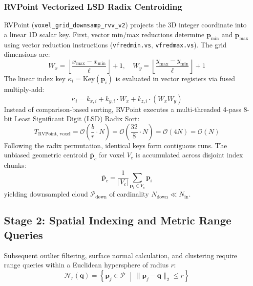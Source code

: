 \documentclass[journal,compsoc]{IEEEtran}
\begin{document}
\subsubsection{RVPoint Vectorized LSD Radix Centroiding}
RVPoint (\texttt{voxel\_grid\_downsamp\_rvv\_v2}) projects the 3D integer coordinate into a linear 1D scalar key. First, vector min/max reductions determine $\bm{p}_{\min}$ and $\bm{p}_{\max}$ using vector reduction instructions (\texttt{vfredmin.vs}, \texttt{vfredmax.vs}). The grid dimensions are:
\begin{equation}
W_x = \left\lfloor \frac{x_{\max} - x_{\min}}{\ell} \right\rfloor + 1, \quad W_y = \left\lfloor \frac{y_{\max} - y_{\min}}{\ell} \right\rfloor + 1
\end{equation}
The linear index key $\kappa_i = \text{Key}(\bm{p}_i)$ is evaluated in vector registers via fused multiply-add:
\begin{equation}
\kappa_i = k_{x,i} + k_{y,i} \cdot W_x + k_{z,i} \cdot (W_x W_y)
\label{eq:voxel_key}
\end{equation}
Instead of comparison-based sorting, RVPoint executes a multi-threaded 4-pass 8-bit Least Significant Digit (LSD) Radix Sort:
\begin{equation}
T_{\text{RVPoint, voxel}} = \mathcal{O}\left( \frac{b}{r} \cdot N \right) = \mathcal{O}\left( \frac{32}{8} \cdot N \right) = \mathcal{O}(4N) = \mathcal{O}(N)
\end{equation}
Following the radix permutation, identical keys form contiguous runs. The unbiased geometric centroid $\bar{\bm{p}}_c$ for voxel $V_c$ is accumulated across disjoint index chunks:
\begin{equation}
\bar{\bm{p}}_c = \frac{1}{|V_c|} \sum_{\bm{p}_i \in V_c} \bm{p}_i
\label{eq:centroid}
\end{equation}
yielding downsampled cloud $\mathcal{P}_{\text{down}}$ of cardinality $N_{\text{down}} \ll N_{\text{in}}$.

\subsection{Stage 2: Spatial Indexing and Metric Range Queries}
\label{sec:spatial_indexing}

Subsequent outlier filtering, surface normal calculation, and clustering require range queries within a Euclidean hypersphere of radius $r$:
\begin{equation}
\mathcal{N}_r(\bm{q}) = \left\{ \bm{p}_j \in \mathcal{P} \;\middle|\; \|\bm{p}_j - \bm{q}\|_2 \le r \right\}
\end{equation}
\end{document}
